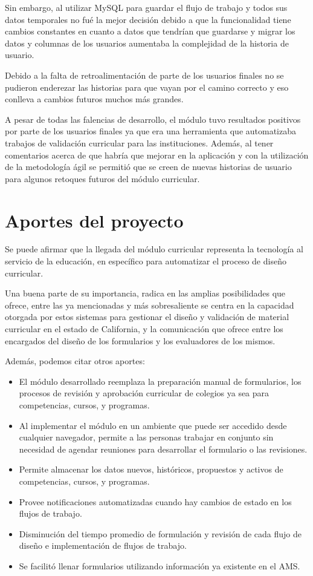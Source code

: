 Sin embargo, al utilizar MySQL para guardar el flujo de trabajo y todos sus datos temporales no fué la mejor decisión debido a que la funcionalidad tiene cambios constantes en cuanto a datos que tendrían que guardarse y migrar los datos y columnas de los usuarios aumentaba la complejidad de la historia de usuario.

Debido a la falta de retroalimentación de parte de los usuarios finales no se pudieron enderezar las historias para que vayan por el camino correcto y eso conlleva a cambios futuros muchos más grandes.

A pesar de todas las falencias de desarrollo, el módulo tuvo resultados positivos por parte de los usuarios finales ya que era una herramienta que automatizaba trabajos de validación curricular para las instituciones. Además, al tener comentarios acerca de que habría que mejorar en la aplicación y con la utilización de la metodología ágil se permitió que se creen de nuevas historias de usuario para algunos retoques futuros del módulo curricular. 

\section{Aportes del proyecto}
Se puede afirmar que la llegada del módulo curricular representa la tecnología al servicio de la educación, en específico para automatizar el proceso de diseño curricular. 

Una buena parte de su importancia, radica en las amplias posibilidades que ofrece, entre las ya mencionadas y más sobresaliente se centra en la capacidad otorgada por estos sistemas para gestionar el diseño y validación de material curricular en el estado de California, y la comunicación que ofrece entre los encargados del diseño de los formularios y los evaluadores de los mismos.

Además, podemos citar otros aportes:
\begin{itemize}
	\item El módulo desarrollado reemplaza la preparación manual de formularios, los procesos de revisión y aprobación curricular de colegios ya sea para competencias, cursos, y programas.
	\item Al implementar el módulo en un ambiente que puede ser accedido desde cualquier navegador, permite a las personas trabajar en conjunto sin necesidad de agendar reuniones para desarrollar el formulario o las revisiones.
	\item Permite almacenar los datos nuevos, históricos, propuestos y activos de competencias, cursos, y programas.
	\item Provee notificaciones automatizadas cuando hay cambios de estado en los flujos de trabajo.
	\item Disminución del tiempo promedio de formulación y revisión de cada flujo de diseño e implementación de flujos de trabajo.
	\item Se facilitó llenar formularios utilizando información ya existente en el AMS.
\end{itemize}


